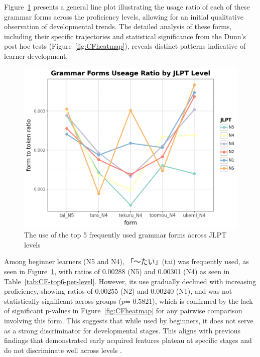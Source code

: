 Figure~\ref{fig:CFplot} presents a general line plot illustrating the usage ratio of each of these grammar forms
across the proficiency levels, allowing for an initial qualitative observation of developmental trends. The detailed
analysis of these forms, including their specific trajectories and statistical significance from the Dunn's post hoc
tests (Figure~\ref{fig:CFheatmap}), reveals distinct patterns indicative of learner development.


\begin{figure}[h]
\centering
\includegraphics[scale=.5]{img/CF-plot}
\caption[The use of the top 5 frequently used grammar forms across JLPT levels]{The use of the top 5 frequently used grammar forms across JLPT levels}
\label{fig:CFplot}
\end{figure}


Among beginner learners (N5 and N4), 「〜たい」(tai) was frequently used, as seen in Figure~\ref{fig:CFplot}, with
ratios of 0.00288 (N5) and 0.00301 (N4) as seen in Table~\ref{tab:CF-top6-per-level}.
However, its
use gradually declined
with
increasing proficiency, showing ratios of 0.00255 (N2) and 0.00240 (N1), and was not statistically significant across
groups ($p$=
0.5821),
which is confirmed by the
lack of
significant p-values in Figure~\ref{fig:CFheatmap} for any pairwise comparison involving this form. This suggests that
while used by beginners, it does not serve as a strong discriminator for developmental stages. This aligns
with previous
findings that demonstrated early acquired features plateau at specific stages and do not discriminate well across
levels \citep{Ortega2003}.

